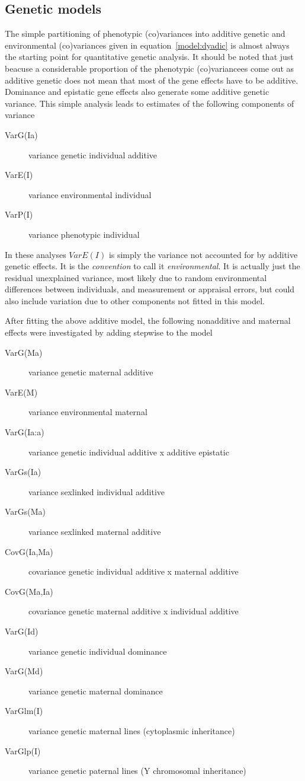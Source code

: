 \documentclass[titlepage]{article}  %
\begin{document}
\subsection{Genetic models}
The simple partitioning of phenotypic (co)variances into additive genetic and environmental (co)variances given in equation~\ref{model:dyadic} is almost always the starting point for quantitative genetic analysis. It should be noted that just beacuse a considerable proportion of the phenotypic (co)variancees come out as additive genetic does not mean that most of the gene effects have to be additive. Dominance and epistatic gene effects also generate some additive genetic variance.  This simple analysis leads to estimates of the following components of variance
\begin{description}
\item[VarG(Ia)] variance genetic individual additive
\item[VarE(I)] variance environmental individual
\item[VarP(I)] variance phenotypic individual
\end{description}
In these analyses $VarE(I)$ is simply the variance not accounted for by additive genetic effects. It is the {\em convention} to call it {\em environmental}. It is actually just the residual unexplained variance, most likely due to random environmental differences between individuals, and measurement or appraisal errors, but could  also include variation due to other components not fitted in this model.

After fitting the above additive model, the following nonadditive and maternal effects were investigated by adding stepwise to the model
\begin{description}
\item[VarG(Ma)] variance genetic maternal additive
\item[VarE(M)] variance environmental maternal
\item[VarG(Ia:a)] variance genetic individual additive x additive epistatic
\item[VarGs(Ia)] variance sexlinked individual additive
\item[VarGs(Ma)] variance sexlinked maternal additive
\item[CovG(Ia,Ma)] covariance genetic individual additive x maternal additive
\item[CovG(Ma,Ia)] covariance genetic maternal additive x individual additive
\item[VarG(Id)] variance genetic individual dominance
\item[VarG(Md)] variance genetic maternal dominance
\item[VarGlm(I)] variance genetic maternal lines (cytoplasmic inheritance)
\item[VarGlp(I)]variance genetic paternal lines (Y chromosomal inheritance)
\end{description}
\end{document}
